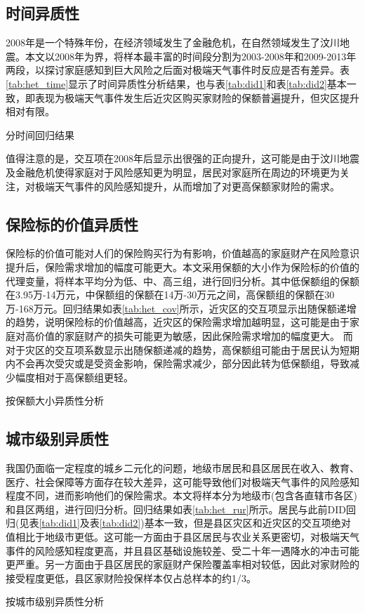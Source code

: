 \subsection{时间异质性}
2008年是一个特殊年份，在经济领域发生了金融危机，在自然领域发生了汶川地震。本文以2008年为界，将样本最丰富的时间段分割为2003-2008年和2009-2013年两段，以探讨家庭感知到巨大风险之后面对极端天气事件时反应是否有差异。表\ref{tab:het_time}显示了时间异质性分析结果，也与表\ref{tab:did1}和表\ref{tab:did2}基本一致，即表现为极端天气事件发生后近灾区购买家财险的保额普遍提升，但灾区提升相对有限。

\begin{table}[H]
    \centering
    \caption{分时间回归结果}\label{tab:het_time}
    
\end{table}

值得注意的是，交互项在2008年后显示出很强的正向提升，这可能是由于汶川地震及金融危机使得家庭对于风险感知更为明显，居民对家庭所在周边的环境更为关注，对极端天气事件的风险感知提升，从而增加了对更高保额家财险的需求。

\subsection{保险标的价值异质性}

保险标的价值可能对人们的保险购买行为有影响，价值越高的家庭财产在风险意识提升后，保险需求增加的幅度可能更大。本文采用保额的大小作为保险标的价值的代理变量，将样本平均分为低、中、高三组，进行回归分析。其中低保额组的保额在3.95万-14万元，中保额组的保额在14万-30万元之间，高保额组的保额在30万-168万元。回归结果如表\ref{tab:het_cov}所示，近灾区的交互项显示出随保额递增的趋势，说明保险标的价值越高，近灾区的保险需求增加越明显，这可能是由于家庭对高价值的家庭财产的损失可能更为敏感，因此保险需求增加的幅度更大。
而对于灾区的交互项系数显示出随保额递减的趋势，高保额组可能由于居民认为短期内不会再次受灾或是受资金影响，保险需求减少，部分因此转为低保额组，导致减少幅度相对于高保额组更轻。
\begin{table}
    \centering
    \caption{按保额大小异质性分析}\label{tab:het_cov}
    
\end{table}

\subsection{城市级别异质性}

我国仍面临一定程度的城乡二元化的问题，地级市居民和县区居民在收入、教育、医疗、社会保障等方面存在较大差异，这可能导致他们对极端天气事件的风险感知程度不同，进而影响他们的保险需求。本文将样本分为地级市(包含各直辖市各区)和县区两组，进行回归分析。回归结果如表\ref{tab:het_rur}所示。居民与此前DID回归(见表\ref{tab:did1}及表\ref{tab:did2})基本一致，但是县区灾区和近灾区的交互项绝对值相比于地级市更低。这可能一方面由于县区居民与农业关系更密切，对极端天气事件的风险感知程度更高，并且县区基础设施较差、受二十年一遇降水的冲击可能更严重。另一方面由于县区居民的家庭财产保险覆盖率相对较低\citep{falco2014crop,胡新艳2021气候变化,TJLT202108007}，因此对家财险的接受程度更低，县区家财险投保样本仅占总样本的约1/3。

\begin{table}[ht]
    \centering
    \caption{按城市级别异质性分析}\label{tab:het_rur}
    
\end{table}
